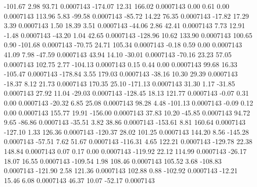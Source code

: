      -101.67        2.98       93.71     0.0007143
     -174.07       12.31      166.02     0.0007143
        0.00        0.61        0.00     0.0007143
      113.96        5.83      -99.58     0.0007143
      -85.72       14.22       76.35     0.0007143
      -17.82       17.29        3.39     0.0007143
        1.50       18.39        3.51     0.0007143
      -44.06        2.86       42.41     0.0007143
        7.73       12.91       -1.48     0.0007143
      -43.20        1.04       42.65     0.0007143
     -128.96       10.62      133.90     0.0007143
      100.65        0.90     -101.68     0.0007143
      -70.75       24.71      105.34     0.0007143
       -0.18        0.59        0.00     0.0007143
       41.09        7.98      -47.59     0.0007143
       43.94       14.10      -30.01     0.0007143
      -70.16       23.23       57.05     0.0007143
      102.75        2.77     -104.13     0.0007143
        0.15        0.44        0.00     0.0007143
       99.68       16.33     -105.47     0.0007143
     -178.84        3.55      179.03     0.0007143
      -38.16       10.30       29.39     0.0007143
      -18.37        8.12       21.73     0.0007143
      170.35       25.10     -171.13     0.0007143
       31.30        1.17      -31.85     0.0007143
       27.92       11.04      -29.03     0.0007143
     -128.45       18.13      121.77     0.0007143
       -0.07        0.31        0.00     0.0007143
      -20.32        6.85       25.08     0.0007143
       98.28        4.48     -101.13     0.0007143
       -0.09        0.12        0.00     0.0007143
      155.77       19.91     -156.00     0.0007143
       37.83       10.20      -45.85     0.0007143
       94.72        9.65      -86.86     0.0007143
      -35.51        3.82       38.86     0.0007143
     -153.61        8.81      160.64     0.0007143
     -127.10        1.33      126.36     0.0007143
     -120.37       28.02      101.25     0.0007143
      144.20        8.56     -145.28     0.0007143
      -57.51        7.62       51.67     0.0007143
     -116.31        4.65      122.21     0.0007143
     -129.78       22.38      148.84     0.0007143
        0.07        0.17        0.00     0.0007143
     -119.92       22.12      114.99     0.0007143
      -26.17       18.07       16.55     0.0007143
     -109.54        1.98      108.46     0.0007143
      105.52        3.68     -108.83     0.0007143
     -121.90        2.58      121.36     0.0007143
      102.88        0.88     -102.92     0.0007143
      -12.21       15.46        6.08     0.0007143
       46.37       10.07      -52.17     0.0007143
